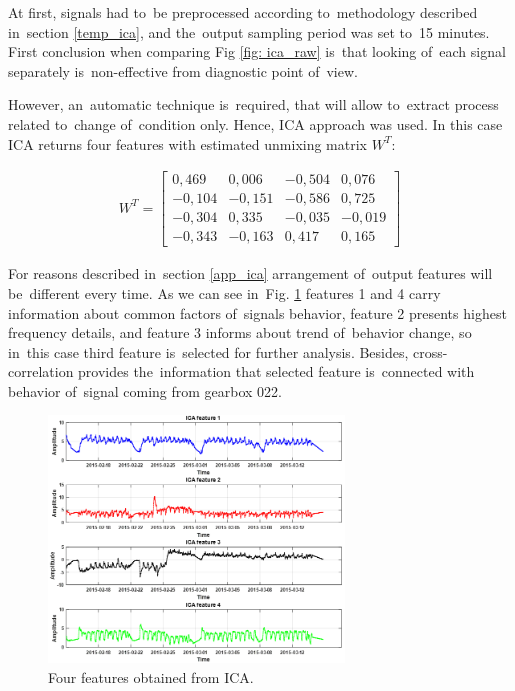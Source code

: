 At first, signals had to~be preprocessed according to~methodology described in~section \ref{temp_ica}, and the~output sampling period was set to~15 minutes. First conclusion when comparing Fig \ref{fig: ica_raw} is~that looking of~each signal separately is~non-effective from diagnostic point of~view. 


However, an~automatic technique is~required, that will allow to~extract process related to~change of~condition only. Hence, ICA approach was used. In this case ICA returns four features with estimated unmixing matrix $W^T$:

\begin{gather}
 W^T =
 \begin{bmatrix}
  0,469 & 0,006 & -0,504 & 0,076 \\
  -0,104 & -0,151 & -0,586 & 0,725 \\
  -0,304 & 0,335 & -0,035 & -0,019 \\
  -0,343 & -0,163 & 0,417 & 0,165
  \end{bmatrix}
\end{gather}

For reasons described in~section \ref{app_ica} arrangement of~output features will be~different every time. As we can see in~Fig. \ref{fig: ica_feat} features 1 and 4 carry information about common factors of~signals behavior, feature 2 presents highest frequency details, and feature 3 informs about trend of~behavior change, so in~this case third feature is~selected for further analysis. Besides, cross-correlation provides the~information that selected feature is~connected with behavior of~signal coming from gearbox 022.

\begin{figure}[ht!]
\centering
\includegraphics[width = 0.7\textwidth]{wykresy/ica_feat.png}
\caption{Four features obtained from ICA.}
\label{fig: ica_feat}
\end{figure}

